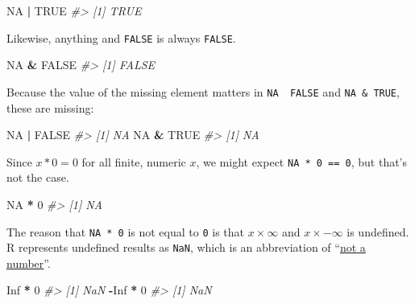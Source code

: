 \documentclass[]{book}
\newenvironment{Shaded}{\begin{snugshade}}{\end{snugshade}}
\newcommand{\CommentTok}[1]{\textcolor[rgb]{0.56,0.35,0.01}{\textit{#1}}}
\newcommand{\DecValTok}[1]{\textcolor[rgb]{0.00,0.00,0.81}{#1}}
\newcommand{\OperatorTok}[1]{\textcolor[rgb]{0.81,0.36,0.00}{\textbf{#1}}}
\newcommand{\OtherTok}[1]{\textcolor[rgb]{0.56,0.35,0.01}{#1}}
\newcommand{\StringTok}[1]{\textcolor[rgb]{0.31,0.60,0.02}{#1}}
\theoremstyle{plain}
\theoremstyle{remark}
\begin{document}
\begin{Shaded}
\begin{Highlighting}[]
\OtherTok{NA} \OperatorTok{|}\StringTok{ }\OtherTok{TRUE}
\CommentTok{#> [1] TRUE}
\end{Highlighting}
\end{Shaded}

Likewise, anything and \texttt{FALSE} is always \texttt{FALSE}.

\begin{Shaded}
\begin{Highlighting}[]
\OtherTok{NA} \OperatorTok{&}\StringTok{ }\OtherTok{FALSE}
\CommentTok{#> [1] FALSE}
\end{Highlighting}
\end{Shaded}

Because the value of the missing element matters in \texttt{NA\ \textbar{}\ FALSE} and \texttt{NA\ \&\ TRUE}, these are missing:

\begin{Shaded}
\begin{Highlighting}[]
\OtherTok{NA} \OperatorTok{|}\StringTok{ }\OtherTok{FALSE}
\CommentTok{#> [1] NA}
\OtherTok{NA} \OperatorTok{&}\StringTok{ }\OtherTok{TRUE}
\CommentTok{#> [1] NA}
\end{Highlighting}
\end{Shaded}

Since \(x * 0 = 0\) for all finite, numeric \(x\), we might expect \texttt{NA\ *\ 0\ ==\ 0}, but that's not the case.

\begin{Shaded}
\begin{Highlighting}[]
\OtherTok{NA} \OperatorTok{*}\StringTok{ }\DecValTok{0}
\CommentTok{#> [1] NA}
\end{Highlighting}
\end{Shaded}

The reason that \texttt{NA\ *\ 0} is not equal to \texttt{0} is that \(x \times \infty\) and \(x \times -\infty\) is undefined.
R represents undefined results as \texttt{NaN}, which is an abbreviation of ``\href{https://en.wikipedia.org/wiki/NaN}{not a number}''.

\begin{Shaded}
\begin{Highlighting}[]
\OtherTok{Inf} \OperatorTok{*}\StringTok{ }\DecValTok{0}
\CommentTok{#> [1] NaN}
\OperatorTok{-}\OtherTok{Inf} \OperatorTok{*}\StringTok{ }\DecValTok{0}
\CommentTok{#> [1] NaN}
\end{Highlighting}
\end{Shaded}
\end{document}
